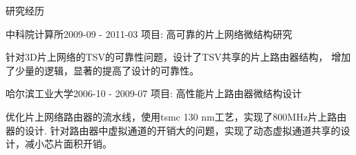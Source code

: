 \documentclass{resume} %
\begin{document}
\begin{rSection}{研究经历}

\begin{rSubsection}{中科院计算所}{2009-09 - 2011-03}{
        项目: 高可靠的片上网络微结构研究}{}
\item 针对3D片上网络的TSV的可靠性问题，设计了TSV共享的片上路由器结构，
    增加了少量的逻辑，显著的提高了设计的可靠性。
\end{rSubsection}


\begin{rSubsection}{哈尔滨工业大学}{2006-10 - 2009-07}{
       项目: 高性能片上路由器微结构设计}{}
\item 优化片上网络路由器的流水线，使用tsmc 130 nm工艺，实现了800MHz片上路由器的设计.
    针对路由器中虚拟通道的开销大的问题，实现了动态虚拟通道共享的设计，减小芯片面积开销。
\end{rSubsection}

\end{rSection}
\end{document}
